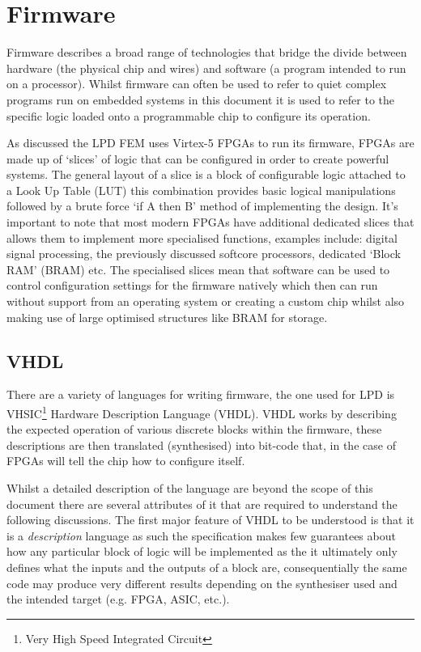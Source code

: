 \section{Firmware} %
\label{sec:firmware}
Firmware describes a broad range of technologies that bridge the divide between hardware (the physical chip and wires) and software (a program intended to run on a processor). Whilst firmware can often be used to refer to quiet complex programs run on embedded systems in this document it is used to refer to the specific logic loaded onto a programmable chip to configure its operation.

As discussed the LPD FEM uses Virtex-5 FPGAs to run its firmware, FPGAs are made up of `slices' of logic that can be configured in order to create powerful systems. The general layout of a slice is a block of configurable logic attached to a Look Up Table (LUT) this combination provides basic logical manipulations followed by a brute force `if A then B' method of implementing the design. It's important to note that most modern FPGAs have additional dedicated slices that allows them to implement more specialised functions, examples include: digital signal processing, the previously discussed softcore processors, dedicated `Block RAM' (BRAM) etc. The specialised slices mean that software can be used to control configuration settings for the firmware natively which then can run without support from an operating system or creating a custom chip whilst also making use of large optimised structures like BRAM for storage.

\subsection{VHDL} %
\label{sub:vhdl}
There are a variety of languages for writing firmware, the one used for LPD is VHSIC\footnote{Very High Speed Integrated Circuit} Hardware Description Language (VHDL). VHDL works by describing the expected operation of various discrete blocks within the firmware, these descriptions are then translated (synthesised) into bit-code that, in the case of FPGAs will tell the chip how to configure itself.

Whilst a detailed description of the language are beyond the scope of this document there are several attributes of it that are required to understand the following discussions. The first major feature of VHDL to be understood is that it is a \emph{description} language as such the specification makes few guarantees about how any particular block of logic will be implemented as the it ultimately only defines what the inputs and the outputs of a block are, consequentially the same code may produce very different results depending on the synthesiser used and the intended target (e.g. FPGA, ASIC, etc.).

